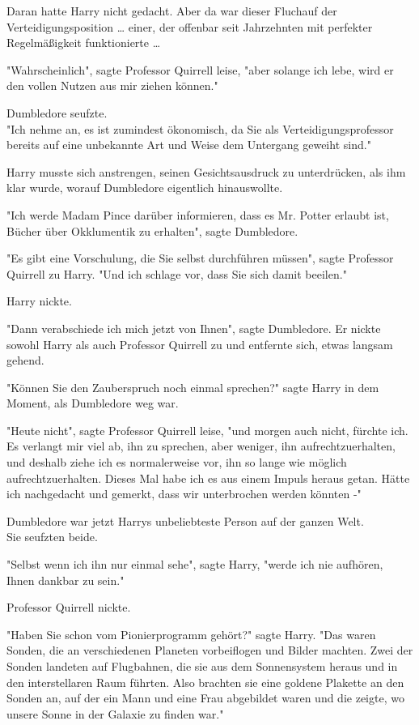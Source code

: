 {Daran hatte Harry nicht gedacht. Aber da war dieser Fluchauf der Verteidigungsposition … einer, der offenbar seit Jahrzehnten mit perfekter Regelmäßigkeit funktionierte …

"Wahrscheinlich", sagte Professor Quirrell leise, "aber solange ich lebe, wird er den vollen Nutzen aus mir ziehen können."

Dumbledore seufzte.\\ "Ich nehme an, es ist zumindest ökonomisch, da Sie als Verteidigungsprofessor bereits auf eine unbekannte Art und Weise dem Untergang geweiht sind."

Harry musste sich anstrengen, seinen Gesichtsausdruck zu unterdrücken, als ihm klar wurde, worauf Dumbledore eigentlich hinauswollte.

"Ich werde Madam Pince darüber informieren, dass es Mr. Potter erlaubt ist, Bücher über Okklumentik zu erhalten", sagte Dumbledore.

"Es gibt eine Vorschulung, die Sie selbst durchführen müssen", sagte Professor Quirrell zu Harry. "Und ich schlage vor, dass Sie sich damit beeilen."

Harry nickte.

"Dann verabschiede ich mich jetzt von Ihnen", sagte Dumbledore. Er nickte\\ sowohl Harry als auch Professor Quirrell zu und entfernte sich, etwas langsam gehend.

"Können Sie den Zauberspruch noch einmal sprechen?" sagte Harry in dem Moment, als Dumbledore weg war.

"Heute nicht", sagte Professor Quirrell leise, "und morgen auch nicht, fürchte ich. Es verlangt mir viel ab, ihn zu sprechen, aber weniger, ihn aufrechtzuerhalten, und deshalb ziehe ich es normalerweise vor, ihn so lange wie möglich aufrechtzuerhalten. Dieses Mal habe ich es aus einem Impuls heraus getan. Hätte ich nachgedacht und gemerkt, dass wir unterbrochen werden könnten -"

Dumbledore war jetzt Harrys unbeliebteste Person auf der ganzen Welt.\\ Sie seufzten beide.

"Selbst wenn ich ihn nur einmal sehe", sagte Harry, "werde ich nie aufhören, Ihnen dankbar zu sein."

Professor Quirrell nickte.

"Haben Sie schon vom Pionierprogramm gehört?" sagte Harry. "Das waren Sonden, die an verschiedenen Planeten vorbeiflogen und Bilder machten. Zwei der Sonden landeten auf Flugbahnen, die sie aus dem Sonnensystem heraus und in den interstellaren Raum führten. Also brachten sie eine goldene Plakette an den Sonden an, auf der ein Mann und eine Frau abgebildet waren und die zeigte, wo unsere Sonne in der Galaxie zu finden war."

}
